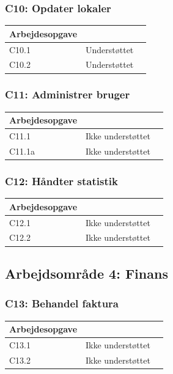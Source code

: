 \subsubsection{C10: Opdater lokaler}
\begin{tabular}{ | l | r | p{} |}
	\hline
	Arbejdesopgave & \\ 
\hline
	C10.1 & Understøttet \\ 
\hline
	C10.2 & Understøttet \\ 
\hline
\end{tabular}

\subsubsection{C11: Administrer bruger}
\begin{tabular}{ | l | r | p{} |}
	\hline
	Arbejdesopgave & \\ 
\hline
	C11.1 & Ikke understøttet \\ 
\hline
	C11.1a & Ikke understøttet \\ 
\hline
\end{tabular}

\subsubsection{C12: Håndter statistik}
\begin{tabular}{ | l | r | p{} |}
	\hline
	Arbejdesopgave & \\ 
\hline
	C12.1 & Ikke understøttet \\ 
\hline
	C12.2 & Ikke understøttet \\ 
\hline
\end{tabular}

\subsection{Arbejdsområde 4: Finans}
\label{Baggrund_Arb_opgaver_Finas}
\subsubsection{C13: Behandel faktura}
\begin{tabular}{ | l | r | p{} |}
	\hline
	Arbejdesopgave & \\ 
\hline
	C13.1 & Ikke understøttet \\ 
\hline
	C13.2 & Ikke understøttet \\ 
\hline
\end{tabular}
